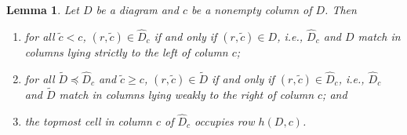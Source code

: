 \documentclass[letterpaper,10pt]{article}
\newtheorem{lemma}[theorem]{Lemma}
\begin{document}
\begin{lemma}\label{lem:minprophelp2}
Let $D$ be a diagram and $c$ be a nonempty column of $D$. Then
\begin{enumerate}
    \item[$(i)$] for all $\tilde{c} < c$, $(r, \tilde{c}) \in \widehat{D}_c$ if and only if $(r, \tilde{c}) \in D$, i.e., $\widehat{D}_c$ and $D$ match in columns lying strictly to the left of column $c$;
    \item[$(ii)$] for all $\tilde{D}\preceq\widehat{D}_c$ and $\tilde{c}\ge c$, $(r,\tilde{c})\in \tilde{D}$ if and only if $(r,\tilde{c})\in\widehat{D}_c$, i.e., $\widehat{D}_c$ and $\tilde{D}$ match in columns lying weakly to the right of column $c$; and
    \item[$(iii)$] the topmost cell in column $c$ of $\widehat{D}_c$ occupies row $h(D,c)$.
\end{enumerate}
\end{lemma}
\end{document}

